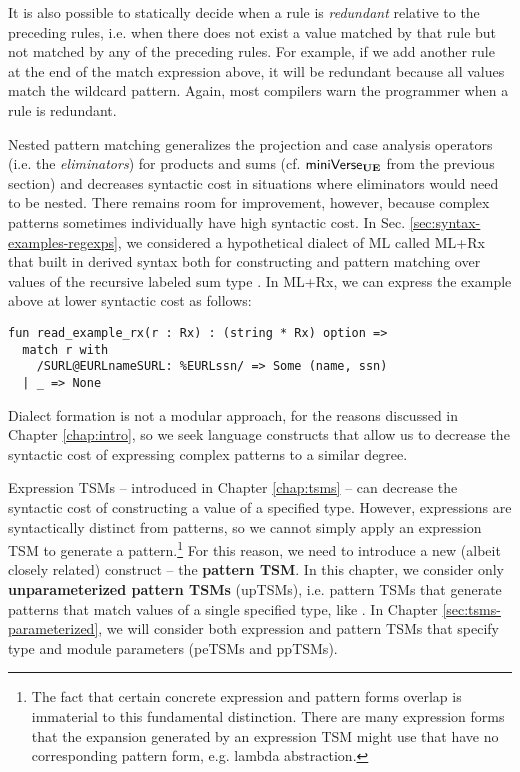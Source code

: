 It is also possible to statically decide when a rule is \emph{redundant} relative to the preceding rules, i.e. when there does not exist a value matched by that rule but not matched by any of the preceding rules. For example, if we add  another rule at the end of the match expression above, it will be redundant because all values match the wildcard pattern. Again, most compilers warn the programmer when a rule is redundant.

Nested pattern matching generalizes the projection and case analysis operators (i.e. the \emph{eliminators}) for products and sums (cf. $\mathsf{miniVerse}_\textbf{UE}$ from the previous section) and decreases syntactic cost in situations where eliminators would need to be nested. There remains room for improvement, however, because complex patterns sometimes    individually have high syntactic cost. In Sec. \ref{sec:syntax-examples-regexps}, we considered a hypothetical dialect of ML called ML+Rx that built in derived syntax both for constructing and pattern matching over values of the recursive labeled sum type . In ML+Rx, we can express the example above at lower syntactic cost as follows:

\begin{lstlisting}
fun read_example_rx(r : Rx) : (string * Rx) option => 
  match r with 
    /SURL@EURLnameSURL: %EURLssn/ => Some (name, ssn)
  | _ => None\end{lstlisting}
\noindent
Dialect formation is not a modular approach, for the reasons discussed in Chapter \ref{chap:intro}, so we seek language constructs that allow us to decrease the syntactic cost of expressing complex patterns to a similar degree.

Expression TSMs -- introduced in Chapter \ref{chap:tsms} -- can decrease the syntactic cost of constructing a value of a specified type. However, expressions are syntactically distinct from patterns, so we cannot simply apply an expression TSM to generate a pattern.\footnote{The fact that certain concrete expression and pattern forms overlap is immaterial to this fundamental distinction. There are many expression forms that the expansion generated by an expression TSM might use that have no corresponding pattern form, e.g.  lambda abstraction.} %
For this reason, we need to introduce a new (albeit closely related) construct -- the \textbf{pattern TSM}. In this chapter, we consider only \textbf{unparameterized pattern TSMs} (upTSMs), i.e. pattern TSMs that generate patterns that match values of a single specified type, like . In Chapter \ref{sec:tsms-parameterized}, we will consider both expression and pattern TSMs that specify type and module parameters (peTSMs and ppTSMs). 

